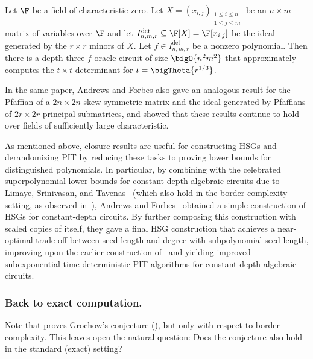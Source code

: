 \documentclass[letterpaper, 11pt]{amsart}
\begin{document}
\begin{thrm}[{\cite[Theorem~1.1]{AF21}}]\label{thrm:AF}
Let $\F$ be a field of characteristic zero.
Let $X = (x_{i,j})_{\substack{1 \leq i \leq n \\ 1 \leq j \leq m}}$ be an $n \times m$ matrix of variables over $\F$ and let $I^{\det}_{n,m,r} \subseteq \F[X] = \F[x_{i,j}]$ be the ideal generated by the $r \times r$ minors of $X$.
Let $f\in  I^{\det}_{n,m,r}$ be a nonzero polynomial.
Then there is a depth-three $f$-oracle circuit of size $\bigO{n^2 m^2}$ that approximately computes the $t \times t$ determinant for $t = \bigTheta{r^{1/3}}$.
\end{thrm}

In the same paper, Andrews and Forbes also gave an analogous result for the Pfaffian of a $2n \times 2n$ skew-symmetric matrix and the ideal generated by Pfaffians of $2r \times 2r$ principal submatrices, and showed that these results continue to hold over fields of sufficiently large characteristic.

As mentioned above, closure results are useful for constructing HSGs and derandomizing PIT by reducing these tasks to proving lower bounds for distinguished polynomials.
In particular, by combining  with the celebrated superpolynomial lower bounds for constant-depth algebraic circuits due to Limaye, Srinivasan, and Tavenas~\cite{LST25} (which also hold in the border complexity setting, as observed in~\cite{AF21}), Andrews and Forbes~\cite{AF21} obtained a simple construction of HSGs for constant-depth circuits.
By further composing this construction with scaled copies of itself, they gave a final HSG construction that achieves a near-optimal trade-off between seed length and degree with subpolynomial seed length, improving upon the earlier construction of~\cite{CKS19} and yielding improved subexponential-time deterministic PIT algorithms for constant-depth algebraic circuits.

\subsubsection*{Back to exact computation.}

Note that  proves Grochow's conjecture (), but only with respect to border complexity.
This leaves open the natural question: Does the conjecture also hold in the standard (exact) setting?
\end{document}
